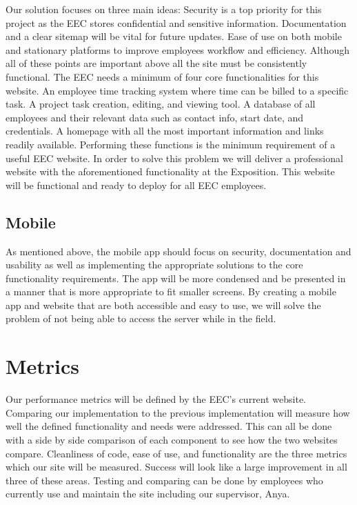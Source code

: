 \documentclass[letterpaper,10pt,titlepage,draftclsnofoot,onecolumn]{IEEEtran}
\begin{document}
Our solution focuses on three main ideas: Security is a top priority for this project as the EEC stores confidential and sensitive information. Documentation and a clear sitemap will be vital for future updates. Ease of use on both mobile and stationary platforms to improve employees workflow and efficiency. Although all of these points are important above all the site must be consistently functional.\newline
The EEC needs a minimum of four core functionalities for this website. An employee time tracking system where time can be billed to a specific task. A project task creation, editing, and viewing tool. A database of all employees and their relevant data such as contact info, start date, and credentials. A homepage with all the most important information and links readily available. Performing these functions is the minimum requirement of a useful EEC website.\newline
In order to solve this problem we will deliver a professional website with the aforementioned functionality at the Exposition. This website will be functional and ready to deploy for all EEC employees.

\subsection{Mobile}

As mentioned above, the mobile app should focus on security, documentation and usability as well as implementing the appropriate solutions to the core functionality requirements. The app will be more condensed and be presented in a manner that is more appropriate to fit smaller screens. By creating a mobile app and website that are both accessible and easy to use, we will solve the problem of not being able to access the server while in the field. 


\section{Metrics}

Our performance metrics will be defined by the EEC’s current website. Comparing our implementation to the previous implementation will measure how well the defined functionality and needs were addressed. This can all be done with a side by side comparison of each component to see how the two websites compare. Cleanliness of code, ease of use, and functionality are the three metrics which our site will be measured. Success will look like a large improvement in all three of these areas. Testing and comparing can be done by employees who currently use and maintain the site including our supervisor, Anya. 
\end{document}
